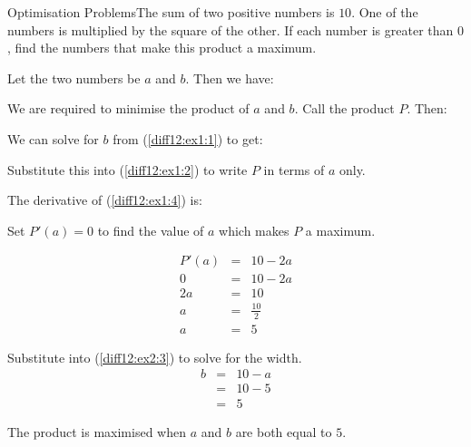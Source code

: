 \begin{wex}
{Optimisation Problems}{The sum of two positive numbers is $10$. One of the numbers is multiplied by the square of the other. If each number is greater than $0$, find the numbers that make this product a maximum.}
{
Let the two numbers be $a$ and $b$. Then we have:


We are required to minimise the product of $a$ and $b$. Call the product $P$. Then:


We can solve for $b$ from (\ref{diff12:ex1:1}) to get:


Substitute this into (\ref{diff12:ex1:2}) to write $P$ in terms of $a$ only.


The derivative of (\ref{diff12:ex1:4}) is:

Set $P'(a)=0$ to find the value of $a$ which makes $P$ a maximum.

\begin{eqnarray*}
P'(a)&=&10-2a\\
0&=&10-2a\\
2a&=&10\\
a&=&\frac{10}{2}\\
a&=&5
\end{eqnarray*}

Substitute into (\ref{diff12:ex2:3}) to solve for the width.
\begin{eqnarray*}
b&=&10-a\\
&=&10-5\\
&=&5
\end{eqnarray*}

The product is maximised when $a$ and $b$ are both equal to $5$.}
\end{wex}

